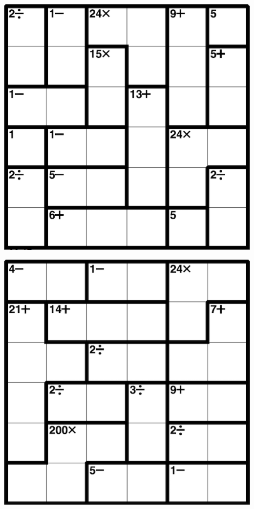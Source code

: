 
\includegraphics[scale=1]{Gambar/Lampiran/6x6_27.png}

\includegraphics[scale=1]{Gambar/Lampiran/6x6_28.png}
